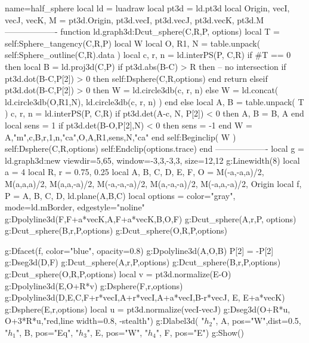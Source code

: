 \documentclass[border=5pt,tikz]{standalone}%
\begin{document}
\begin{luadraw}{name=half_sphere}
local ld = luadraw
local pt3d = ld.pt3d
local Origin, vecI, vecJ, vecK, M = pt3d.Origin, pt3d.vecI, pt3d.vecJ, pt3d.vecK, pt3d.M
-------------------
function ld.graph3d:Dcut_sphere(C,R,P, options)
    local T = self:Sphere_tangency(C,R,P)
    local W
    local O, R1, N = table.unpack( self:Sphere_outline(C,R).data )
    local c, r, n = ld.interPS(P, {C,R})
    if #T == 0 then
        local B = ld.proj3d(C,P)
        if pt3d.abs(B-C) > R then -- no intersection
            if pt3d.dot(B-C,P[2]) > 0 then self:Dsphere(C,R,options) end
            return 
        elseif pt3d.dot(B-C,P[2]) > 0 then 
            W = ld.circle3db(c, r, n)
        else 
            W = ld.concat( ld.circle3db(O,R1,N), ld.circle3db(c, r, n) )
        end
    else
        local A, B = table.unpack( T )
        c, r, n = ld.interPS(P, {C,R})
        if pt3d.det(A-c, N, P[2]) < 0 then A, B = B, A end
        local sens = 1
        if pt3d.det(B-O,P[2],N) < 0 then sens = -1 end
        W = {A,"m",c,B,r,1,n,"ca",O,A,R1,sens,N,"ca"}
    end
    self:Beginclip( W )
        self:Dsphere(C,R,options)
    self:Endclip(options.trace)
end
-------------------
local g = ld.graph3d:new{ viewdir={5,65}, window={-3,3,-3,3}, size={12,12} }
g:Linewidth(8)
local a = 4
local R, r = 0.75, 0.25
local A, B, C, D, E, F, O = M(-a,-a,a)/2, M(a,a,a)/2, M(a,a,-a)/2, M(-a,-a,-a)/2, M(a,-a,-a)/2, M(-a,a,-a)/2, Origin
local f, P = {A, B, C, D}, ld.plane(A,B,C)
local options = {color="gray", mode=ld.mBorder, edgestyle="noline"}
g:Dpolyline3d({{F,F+a*vecK,A},{F+a*vecK,B},{O,F}})
g:Dcut_sphere(A,r,P, options)
g:Dcut_sphere(B,r,P,options)
g:Dcut_sphere(O,R,P,options)

g:Dfacet(f, {color="blue", opacity=0.8})
g:Dpolyline3d({{A,O,B}})
P[2] = -P[2]
g:Dseg3d({D,F})
g:Dcut_sphere(A,r,P,options)
g:Dcut_sphere(B,r,P,options)
g:Dcut_sphere(O,R,P,options)
local v = pt3d.normalize(E-O)
g:Dpolyline3d({E,O+R*v})
g:Dsphere(F,r,options)
g:Dpolyline3d({{D,E,C,F+r*vecI},{A+r*vecI,A+a*vecI,B-r*vecJ}, {E, E+a*vecK}})
g:Dsphere(E,r,options)
local u = pt3d.normalize(vecI-vecJ)
g:Dseg3d({O+R*u, O+3*R*u},"red,line width=0.8, -stealth")
g:Dlabel3d(
    "$h_2$", A, {pos="W",dist=0.5},
    "$h_1$", B, {pos="Eq"},
    "$h_3$", E, {pos="W"},
    "$h_4$", F, {pos="E"})
g:Show()
\end{luadraw}
\end{document}
